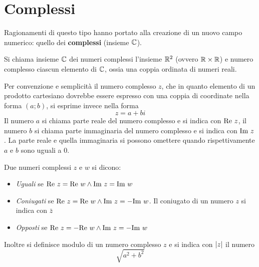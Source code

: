 %
%
%
%


\section{Complessi}
Ragionamenti di questo tipo hanno portato alla creazione di un nuovo campo numerico: quello dei \textbf{complessi} (insieme $\mathbb{C}$).

\begin{defin}
	Si chiama insieme $\mathbb{C}$ dei numeri complessi l'insieme $\mathbb{R}^2$ (ovvero $\mathbb{R}\times\mathbb{R}$) e numero complesso ciascun elemento di $\mathbb{C}$, ossia una coppia ordinata di numeri reali.
\end{defin}
Per convenzione e semplicità il numero complesso $z$, che in quanto elemento di un prodotto cartesiano dovrebbe essere espresso con una coppia di coordinate nella forma $(a;b)$, si esprime invece nella forma
\[
	z = a + bi
\]
Il numero $a$ si chiama parte reale del numero complesso e si indica con $\textrm{Re } z$, il numero $b$ si chiama parte immaginaria del numero complesso e si indica con $\textrm{Im } z$. La parte reale e quella immaginaria si possono omettere quando rispettivamente $a$ e $b$ sono uguali a $0$.

\begin{defin}
	Due numeri complessi $z$ e $w$ si dicono:
	\begin{itemize}
		\item \emph{Uguali} se $\textrm{Re } z=\textrm{Re } w\land\textrm{Im } z=\textrm{Im } w$
		\item \emph{Coniugati} se $\textrm{Re } z=\textrm{Re } w\land\textrm{Im } z=-\textrm{Im } w$. Il coniugato di un numero $z$ si indica con $\bar z$
		\item \emph{Opposti} se $\textrm{Re } z=-\textrm{Re } w\land\textrm{Im } z=-\textrm{Im } w$
	\end{itemize}
	Inoltre si definisce modulo di un numero complesso $z$ e si indica con $\left\lvert z \right\rvert$ il numero
	\[
		\sqrt{a^2+b^2}
	\]
\end{defin}


